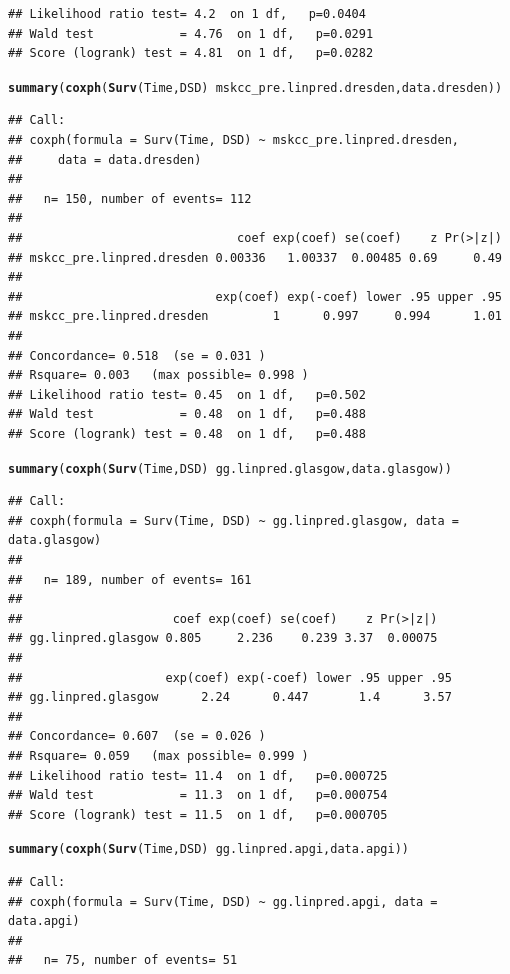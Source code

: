 \documentclass{article}\usepackage[]{graphicx}\usepackage[]{color}
\makeatletter
\newcommand{\hlopt}[1]{\textcolor[rgb]{0,0,0}{#1}}%
\newcommand{\hlstd}[1]{\textcolor[rgb]{0.345,0.345,0.345}{#1}}%
\newcommand{\hlkwd}[1]{\textcolor[rgb]{0.737,0.353,0.396}{\textbf{#1}}}%
\newenvironment{kframe}{%
 \def\at@end@of@kframe{}%
 \ifinner\ifhmode%
  \def\at@end@of@kframe{\end{minipage}}%
  \begin{minipage}{\columnwidth}%
 \fi\fi%
 \def\FrameCommand##1{\hskip\@totalleftmargin \hskip-\fboxsep
 \colorbox{shadecolor}{##1}\hskip-\fboxsep
     \hskip-\linewidth \hskip-\@totalleftmargin \hskip\columnwidth}%
 \MakeFramed {\advance\hsize-\width
   \@totalleftmargin\z@ \linewidth\hsize
   \@setminipage}}%
 {\par\unskip\endMakeFramed%
 \at@end@of@kframe}
\newenvironment{knitrout}{}{} %
\makeatother
\begin{document}
\begin{knitrout}
\begin{kframe}
\begin{verbatim}
## Likelihood ratio test= 4.2  on 1 df,   p=0.0404
## Wald test            = 4.76  on 1 df,   p=0.0291
## Score (logrank) test = 4.81  on 1 df,   p=0.0282
\end{verbatim}
\begin{alltt}
\hlkwd{summary}\hlstd{(}\hlkwd{coxph}\hlstd{(}\hlkwd{Surv}\hlstd{(Time, DSD)} \hlopt{~} \hlstd{mskcc_pre.linpred.dresden, data.dresden))}
\end{alltt}
\begin{verbatim}
## Call:
## coxph(formula = Surv(Time, DSD) ~ mskcc_pre.linpred.dresden, 
##     data = data.dresden)
## 
##   n= 150, number of events= 112 
## 
##                              coef exp(coef) se(coef)    z Pr(>|z|)
## mskcc_pre.linpred.dresden 0.00336   1.00337  0.00485 0.69     0.49
## 
##                           exp(coef) exp(-coef) lower .95 upper .95
## mskcc_pre.linpred.dresden         1      0.997     0.994      1.01
## 
## Concordance= 0.518  (se = 0.031 )
## Rsquare= 0.003   (max possible= 0.998 )
## Likelihood ratio test= 0.45  on 1 df,   p=0.502
## Wald test            = 0.48  on 1 df,   p=0.488
## Score (logrank) test = 0.48  on 1 df,   p=0.488
\end{verbatim}
\begin{alltt}
\hlkwd{summary}\hlstd{(}\hlkwd{coxph}\hlstd{(}\hlkwd{Surv}\hlstd{(Time, DSD)} \hlopt{~} \hlstd{gg.linpred.glasgow, data.glasgow))}
\end{alltt}
\begin{verbatim}
## Call:
## coxph(formula = Surv(Time, DSD) ~ gg.linpred.glasgow, data = data.glasgow)
## 
##   n= 189, number of events= 161 
## 
##                     coef exp(coef) se(coef)    z Pr(>|z|)
## gg.linpred.glasgow 0.805     2.236    0.239 3.37  0.00075
## 
##                    exp(coef) exp(-coef) lower .95 upper .95
## gg.linpred.glasgow      2.24      0.447       1.4      3.57
## 
## Concordance= 0.607  (se = 0.026 )
## Rsquare= 0.059   (max possible= 0.999 )
## Likelihood ratio test= 11.4  on 1 df,   p=0.000725
## Wald test            = 11.3  on 1 df,   p=0.000754
## Score (logrank) test = 11.5  on 1 df,   p=0.000705
\end{verbatim}
\begin{alltt}
\hlkwd{summary}\hlstd{(}\hlkwd{coxph}\hlstd{(}\hlkwd{Surv}\hlstd{(Time, DSD)} \hlopt{~} \hlstd{gg.linpred.apgi, data.apgi))}
\end{alltt}
\begin{verbatim}
## Call:
## coxph(formula = Surv(Time, DSD) ~ gg.linpred.apgi, data = data.apgi)
## 
##   n= 75, number of events= 51 

\end{verbatim}
\end{kframe}
\end{knitrout}
\end{document}

